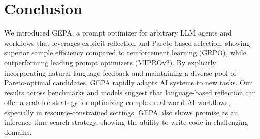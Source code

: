 \documentclass{article} %
\begin{document}















\section{Conclusion}
We introduced GEPA, a prompt optimizer for arbitrary LLM agents and workflows that leverages explicit reflection and Pareto-based selection, showing superior sample efficiency compared to reinforcement learning (GRPO), while outperforming leading prompt optimizers (MIPROv2). By explicitly incorporating natural language feedback and maintaining a diverse pool of Pareto-optimal candidates, GEPA rapidly adapts AI systems to new tasks. Our results across benchmarks and models suggest that language-based reflection can offer a scalable strategy for optimizing complex real-world AI workflows, especially in resource-constrained settings. GEPA also shows promise as an inference-time search strategy, showing the ability to write code in challenging domains.
\end{document}

